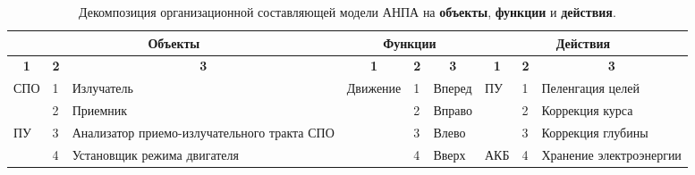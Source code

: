 \begin{landscape}
\begin{longtable}[c]{llm{}||l|l|m{}||llm{}}
\caption{Декомпозиция организационной составляющей модели АНПА на \textbf{объекты}, \textbf{функции} и \textbf{действия}.}
\label{tbl:model_anpa_decompose}\\
\hline
\multicolumn{3}{|c||}{\textbf{Объекты}}                                                                                     & \multicolumn{3}{c||}{\textbf{Функции}}                                                                  & \multicolumn{3}{c|}{\textbf{Действия}}                                                                                                  \\ \hline
\endhead
%
\multicolumn{1}{|c|}{\textbf{1}}           & \multicolumn{1}{c|}{\textbf{2}} & \multicolumn{1}{c||}{\textbf{3}}            & \multicolumn{1}{c|}{\textbf{1}}   & \multicolumn{1}{c|}{\textbf{2}} & \multicolumn{1}{c||}{\textbf{3}} & \multicolumn{1}{c|}{\textbf{1}}           & \multicolumn{1}{c|}{\textbf{2}} & \multicolumn{1}{c|}{\textbf{3}}                           \\ \hline
\multicolumn{1}{|l|}{\multirow{2}{*}{СПО}} & \multicolumn{1}{l|}{1}          & Излучатель                                  & \multirow{5}{*}{Движение}         & 1                               & Вперед                           & \multicolumn{1}{l|}{\multirow{3}{*}{ПУ}}  & \multicolumn{1}{l|}{1}          & \multicolumn{1}{l|}{Пеленгация целей}                     \\ \cline{2-3} \cline{5-6} \cline{8-9} 
\multicolumn{1}{|l|}{}                     & \multicolumn{1}{l|}{2}          & Приемник                                    &                                   & 2                               & Вправо                           & \multicolumn{1}{l|}{}                     & \multicolumn{1}{l|}{2}          & \multicolumn{1}{l|}{Коррекция курса}                      \\ \cline{1-3} \cline{5-6} \cline{8-9} 
\multicolumn{1}{|l|}{\multirow{4}{*}{ПУ}}  & \multicolumn{1}{l|}{3}          & Анализатор приемо-излучательного тракта СПО &                                   & 3                               & Влево                            & \multicolumn{1}{l|}{}                     & \multicolumn{1}{l|}{3}          & \multicolumn{1}{l|}{Коррекция глубины}                    \\ \cline{2-3} \cline{5-9} 
\multicolumn{1}{|l|}{}                     & \multicolumn{1}{l|}{4}          & Установщик режима двигателя                 &                                   & 4                               & Вверх                            & \multicolumn{1}{l|}{\multirow{2}{*}{АКБ}} & \multicolumn{1}{l|}{4}          & \multicolumn{1}{l|}{Хранение электроэнергии}              \\ \cline{2-3} \cline{5-6} \cline{8-9} 

\end{longtable}
\end{landscape}

